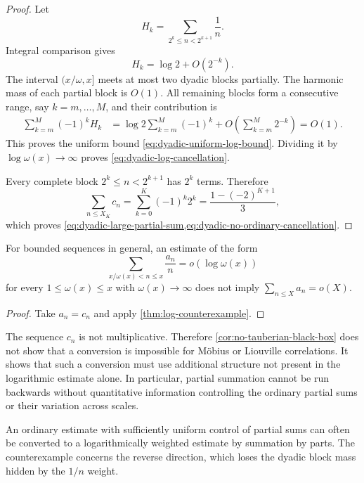 \begin{proof}
Let
\[
 H_k=\sum_{2^k\le n<2^{k+1}}\frac1n.
\]
Integral comparison gives
\begin{equation}
 H_k=\log2+O(2^{-k}).
 \label{eq:dyadic-block-harmonic-mass}
\end{equation}
The interval \((x/\omega,x]\) meets at most two dyadic blocks
partially.  The harmonic mass of each partial block is \(O(1)\).
All remaining blocks form a consecutive range, say
\(k=m,\ldots,M\), and their contribution is
\begin{align*}
 \sum_{k=m}^M(-1)^kH_k
 &=
 \log2\sum_{k=m}^M(-1)^k
 +O\left(\sum_{k=m}^M2^{-k}\right)
 =O(1).
\end{align*}
This proves the uniform bound
\eqref{eq:dyadic-uniform-log-bound}.  Dividing it by
\(\log\omega(x)\to\infty\) proves
\eqref{eq:dyadic-log-cancellation}.

Every complete block \(2^k\le n<2^{k+1}\) has \(2^k\) terms.
Therefore
\[
 \sum_{n\le X_K}c_n
 =\sum_{k=0}^K(-1)^k2^k
 =\frac{1-(-2)^{K+1}}3,
\]
which proves
\cref{eq:dyadic-large-partial-sum,eq:dyadic-no-ordinary-cancellation}.
\end{proof}

\begin{corollary}
\label{cor:no-tauberian-black-box}
For bounded sequences in general, an estimate of the form
\begin{equation}
 \sum_{x/\omega(x)<n\le x}\frac{a_n}{n}
 =o(\log\omega(x))
 \label{eq:abstract-log-hypothesis}
\end{equation}
for every \(1\le\omega(x)\le x\) with
\(\omega(x)\to\infty\) does not imply
\(\sum_{n\le X}a_n=o(X)\).
\end{corollary}

\begin{proof}
Take \(a_n=c_n\) and apply \cref{thm:log-counterexample}.
\end{proof}

\begin{remark}
\label{rem:counterexample-not-multiplicative}
The sequence \(c_n\) is not multiplicative.  Therefore
\cref{cor:no-tauberian-black-box} does not show that a conversion is
impossible for M\"obius or Liouville correlations.  It shows that such
a conversion must use additional structure not present in the
logarithmic estimate alone.  In particular, partial summation cannot
be run backwards without quantitative information controlling the
ordinary partial sums or their variation across scales.
\end{remark}

\begin{remark}
An ordinary estimate with sufficiently uniform control of partial
sums can often be converted to a logarithmically weighted estimate by
summation by parts.  The counterexample concerns the reverse
direction, which loses the dyadic block mass hidden by the \(1/n\)
weight.
\end{remark}
